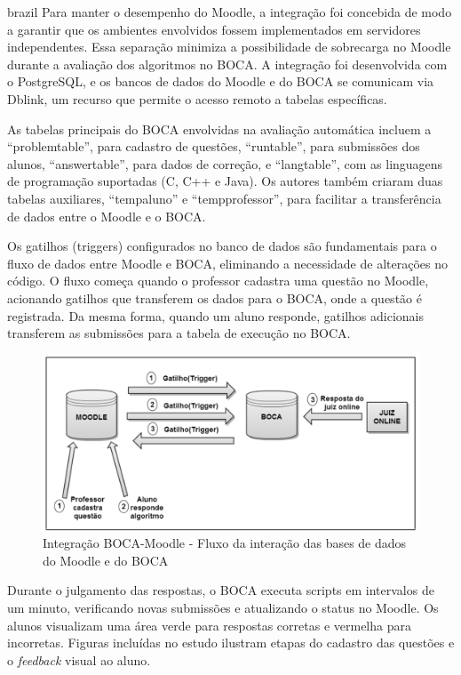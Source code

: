 \begin{otherlanguage*}{brazil}
Para manter o desempenho do Moodle, a integração foi concebida de modo a garantir que os ambientes envolvidos fossem implementados em servidores independentes. Essa separação minimiza a possibilidade de sobrecarga no Moodle durante a avaliação dos algoritmos no BOCA. A integração foi desenvolvida com o PostgreSQL, e os bancos de dados do Moodle e do BOCA se comunicam via Dblink, um recurso que permite o acesso remoto a tabelas específicas.

As tabelas principais do BOCA envolvidas na avaliação automática incluem a “problemtable”, para cadastro de questões, “runtable”, para submissões dos alunos, “answertable”, para dados de correção, e “langtable”, com as linguagens de programação suportadas (C, C++ e Java). Os autores também criaram duas tabelas auxiliares, “tempaluno” e “tempprofessor”, para facilitar a transferência de dados entre o Moodle e o BOCA.

Os gatilhos (triggers) configurados no banco de dados são fundamentais para o fluxo de dados entre Moodle e BOCA, eliminando a necessidade de alterações no código. O fluxo começa quando o professor cadastra uma questão no Moodle, acionando gatilhos que transferem os dados para o BOCA, onde a questão é registrada. Da mesma forma, quando um aluno responde, gatilhos adicionais transferem as submissões para a tabela de execução no BOCA.

\begin{figure}[h!]
	   \centering
            \caption{Integração BOCA-Moodle - Fluxo da interação das bases de dados do Moodle e do BOCA}
            \label{fig:ModeloConceitual}
	   	\includegraphics[scale=0.3]{pictures/BOCA_fluxo.png}
\end{figure}

Durante o julgamento das respostas, o BOCA executa scripts em intervalos de um minuto, verificando novas submissões e atualizando o status no Moodle. Os alunos visualizam uma área verde para respostas corretas e vermelha para incorretas. Figuras incluídas no estudo ilustram etapas do cadastro das questões e o \textit{feedback} visual ao aluno.


\end{otherlanguage*}
